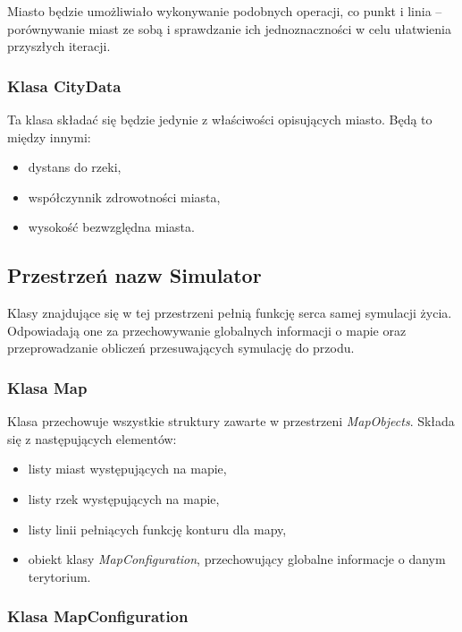 \documentclass[a4paper,12pt]{article}
\newcommand\tab[1][0.6cm]{\hspace*{#1} }
\begin{document}
Miasto będzie umożliwiało wykonywanie podobnych operacji, co punkt i linia -- porównywanie miast ze sobą i sprawdzanie ich jednoznaczności w celu ułatwienia przyszłych iteracji.

\subsubsection{Klasa CityData}

\tab Ta klasa składać się będzie jedynie z właściwości opisujących miasto. Będą to między innymi:

\begin{itemize}
\item dystans do rzeki,
\item współczynnik zdrowotności miasta,
\item wysokość bezwzględna miasta.
\end{itemize}

\subsection{Przestrzeń nazw Simulator}

\tab Klasy znajdujące się w tej przestrzeni pełnią funkcję serca samej symulacji życia. Odpowiadają one za przechowywanie globalnych informacji o mapie oraz przeprowadzanie obliczeń przesuwających symulację do przodu.

\subsubsection{Klasa Map}

\tab Klasa przechowuje wszystkie struktury zawarte w przestrzeni \textit{MapObjects}. Składa się z następujących elementów:

\begin{itemize}
\item listy miast występujących na mapie,
\item listy rzek występujących na mapie,
\item listy linii pełniących funkcję konturu dla mapy,
\item obiekt klasy \textit{MapConfiguration}, przechowujący globalne informacje o danym terytorium.
\end{itemize}


\subsubsection{Klasa MapConfiguration}
\end{document}
